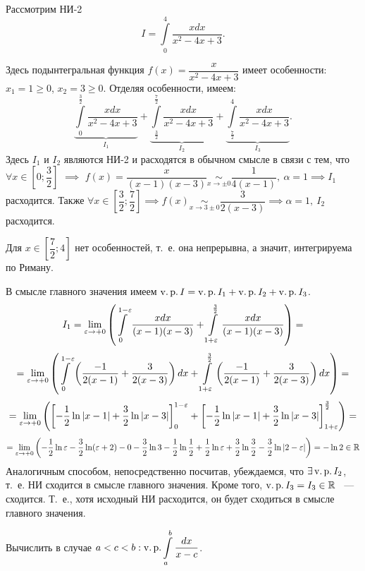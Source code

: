 \documentclass[../../main.tex]{subfiles}
\begin{document}
\begin{exmp}
Рассмотрим НИ-2 \[ I = \int\limits_0^4 \dfrac{xdx}{x^2 - 4x + 3} .\]

Здесь подынтегральная функция $ f(x) = \dfrac{x}{x^2 - 4x + 3} $ имеет
особенности: $ x_1 = 1 \geq 0$, $ x_2 = 3 \geq 0 $.
Отделяя особенности, имеем:
\[
\underbrace{\int\limits_0^{\frac{3}{2}} \dfrac{xdx}{x^2 - 4x + 3}}_{I_1} +
\underbrace{\int\limits_\frac{3}{2}^\frac{7}{2}\dfrac{xdx}{x^2 - 4x + 
3}}_{I_2} +
\underbrace{\int\limits_\frac{7}{2}^4\dfrac{xdx}{x^2 - 4x + 3}}_{I_3}.
\] 
Здесь $ I_1 \text{ и } I_2 $ являются НИ-2 и расходятся в обычном смысле
в связи с тем, что ${\forall x \in \left[0; \dfrac{3}{2}\right]}$ $\implies$
$f(x) = \dfrac{x}{(x - 1)(x - 3)} \underset{x \to \pm 0}{\sim}
\dfrac{1}{4(x - 1)},\ \alpha = 1 \implies I_1$ расходится. Также
${\forall x \in \left[\dfrac{3}{2}; \dfrac{7}{2}\right]} \implies 
f(x) \underset{x \to 3 \pm 0}{\sim} \dfrac{3}{2(x - 3)} \implies \alpha = 1,\
I_2$ расходится.

Для $ x \in \left[\dfrac{7}{2}; 4\right] $ нет
особенностей, т.~е. она непрерывна, а значит, интегрируема по Риману.

В смысле главного значения имеем
$ \operatorname{v.p.} I = \operatorname{v.p.} I_1 + \operatorname{v.p.} I_2 + \operatorname{v.p.} I_3 $.
\[
I_1 = \lim\limits_{\varepsilon \to +0} \left(
\int\limits_0^{1 - \varepsilon} \dfrac{xdx}{(x-1)(x-3)} +
\int\limits_{1 + \varepsilon}^\frac{3}{2} \dfrac{xdx}{(x-1)(x-3)}
\right) = \]
\[ =
\lim\limits_{\varepsilon \to +0} \left(
\int\limits_0^{1 - \varepsilon} \left(
\dfrac{-1}{2(x - 1)} + \dfrac{3}{2(x - 3)}
\right) dx + \int\limits_{1 + \varepsilon}^\frac{3}{2} \left(
\dfrac{-1}{2(x - 1)} + \dfrac{3}{2(x - 3)}
\right) dx
\right) =
\]
\[ =
\lim\limits_{\varepsilon \to +0} \left(
\left[
-\dfrac{1}{2} \ln{|x - 1|} + \dfrac{3}{2} \ln{|x - 3|} 
\right]_0^{1 - \varepsilon} +
\left[
-\dfrac{1}{2} \ln{|x - 1|} + \dfrac{3}{2} \ln{|x - 3|}
\right]_{1 + \varepsilon}^\frac{3}{2}
\right) =
\]
\[ =
\lim\limits_{\varepsilon \to +0} \left(
-\dfrac{1}{2}\ln\varepsilon - \dfrac{3}{2}\ln(\varepsilon + 2) - 0 - \dfrac{3}{2}\ln3 -
\dfrac{1}{2}\ln\dfrac{1}{2} + \dfrac{1}{2}\ln\varepsilon + 
\dfrac{3}{2}\ln\dfrac{3}{2}-
\dfrac{3}{2}\ln|2 - \varepsilon|
\right) = -\ln 2 \in \mathbb{R}
\]
Аналогичным способом, непосредственно посчитав, убеждаемся, что $ \exists \operatorname{v.p.}
I_2$, т.~е. НИ сходится в смысле главного значения. Кроме того, $ \operatorname{v.p.} I_3 = 
I_3 \in \mathbb{R} $ ~--- сходится. Т.~е., хотя исходный НИ расходится, он будет 
сходиться в смысле главного значения.
\end{exmp}
\begin{exercise}
	Вычислить в случае $ a < c < b : \operatorname{v.p.} \displaystyle\int\limits_a^b 
	\dfrac{dx}{x - c} $.
\end{exercise}
\end{document}
